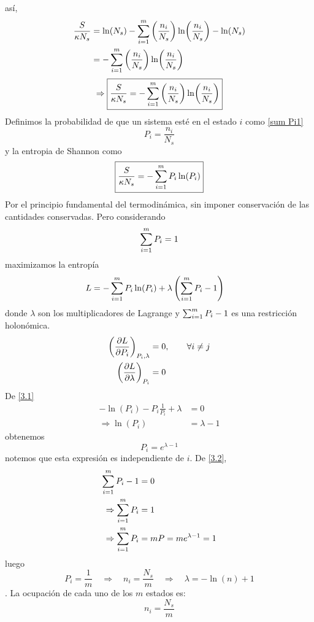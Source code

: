 así,
\begin{align}
  \frac{S}{\kappa N_s}&=\ln(N_s)-\sum_{i=1}^m \left(\frac{n_i}{N_s}\right)\ln(\frac{n_i}{N_s})-\ln(N_s)\\
  &=-\sum_{i=1}^m\left(\frac{n_i}{N_s}\right)\ln(\frac{n_i}{N_s})
\end{align}
\begin{equation}
  \Rightarrow \boxed{\frac{S}{\kappa N_s}=-\sum_{i=1}^m\left(\frac{n_i}{N_s}\right)\ln(\frac{n_i}{N_s})}
\end{equation}
Definimos la probabilidad de que un sistema esté en el estado $i$ como \eqref{sum Pi1}
\begin{equation}
\boxed{P_i=\frac{n_i}{N_s}}
\end{equation}
y la entropia de Shannon como
\begin{equation}
  \boxed{\frac{S}{\kappa N_s}=-\sum_{i=1}^m P_i\ln (P_i)}
\end{equation}
Por el principio fundamental del termodinámica, sin imponer conservación de las cantidades conservadas. Pero considerando
\begin{equation}
  \sum_{i=1}^m P_i=1
\end{equation}
maximizamos la entropía
\begin{align}
  L&=-\sum_{i=1}^m P_i\ln(P_i)+\lambda\left(\sum_{i=1}^m P_i-1\right)
\end{align}
donde $\lambda$ son los multiplicadores de Lagrange y $\sum_{i=1}^m P_i-1$ es una restricción holonómica.
\begin{align}
  \left(\pdv{L}{P_i}\right)_{P_i,\lambda}&=0,\qquad \forall i\neq j\label{3.1}\\
  \left(\pdv{L}{\lambda}\right)_{P_i}&=0\label{3.2}
\end{align}
De \eqref{3.1}
\begin{align}
  -\ln(P_i)-P_i\frac{1}{P_i}+\lambda&=0\\
  \Rightarrow \ln(P_i)&=\lambda-1
\end{align}
obtenemos
\begin{equation}
  P_i=e^{\lambda-1}
\end{equation}
notemos que esta expresión es independiente de $i$.
De \eqref{3.2},
\begin{align}
  \sum_{i=1}^m P_i-1&=0\\
 \Rightarrow \sum_{i=1}^m P_i&=1\\
 \Rightarrow \sum_{i=1}^m P_i&=mP=me^{\lambda-1}=1
\end{align}
luego
\begin{equation}
  P_i=\frac{1}{m}\quad \Rightarrow\quad n_i=\frac{N_s}{m}\quad\Rightarrow\quad \lambda=-\ln(n)+1
\end{equation}
. La ocupación de cada uno de los $m$ estados es:
\begin{equation}
  \boxed{n_i=\frac{N_s}{m}}
\end{equation}

